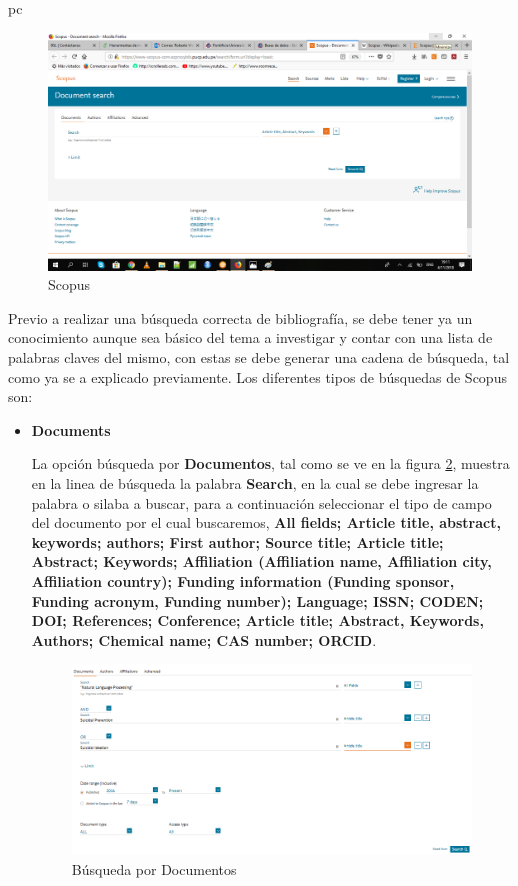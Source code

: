 pc\documentclass[a4paper,12pt,openany]{book}
\begin{document}
\begin{itemize}
        \begin{figure}[H]
        \centering
    	\includegraphics[width=12cm]{Scop2.png}
        \caption{Scopus}
        \label{fig:scop2}
        \end{figure}

Previo a realizar una búsqueda correcta de bibliografía, se debe tener ya un conocimiento
aunque sea básico del tema a investigar y contar con una lista de palabras claves del
mismo, con estas se debe generar una cadena de búsqueda, tal como ya se a explicado previamente. Los diferentes
tipos de búsquedas de Scopus son:

\begin{itemize}
    \item \textbf{Documents}

 La opción búsqueda por \textbf{Documentos}, tal como se ve en la figura \ref{fig:scop3}, muestra en la linea de búsqueda la palabra \textbf{Search}, en la cual se debe ingresar la palabra o silaba a buscar, para a continuación seleccionar el tipo de campo del documento por el cual buscaremos, \textbf{All fields; Article title, abstract, keywords; authors; First author; Source title; Article title; Abstract; Keywords; Affiliation (Affiliation name, Affiliation city, Affiliation country); Funding information (Funding sponsor, Funding acronym, Funding number); Language; ISSN; CODEN; DOI; References; Conference; Article title; Abstract, Keywords, Authors; Chemical name; CAS number; ORCID}. 
 

        \begin{figure}[H]
        \centering
    	\includegraphics[width=12cm]{Scop3.png}
        \caption{Búsqueda por Documentos}
        \label{fig:scop3}
        \end{figure}


\end{itemize}
\end{itemize}
\end{document}
